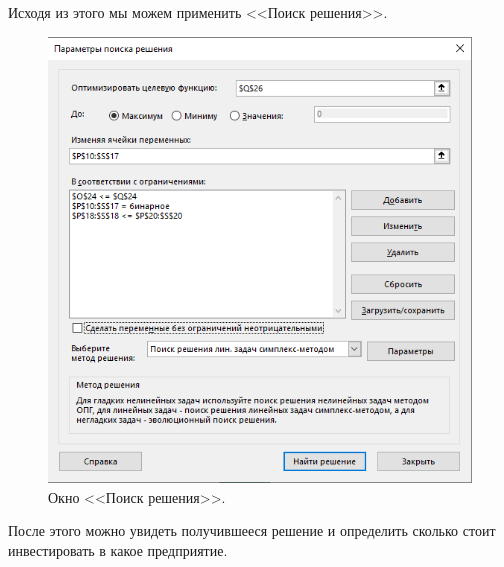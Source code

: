 Исходя из этого мы можем применить <<Поиск решения>>.
\begin{figure}[h]
  \centering \includegraphics[scale=0.7]{content/images/impl_investing3.png}
  \caption{Окно <<Поиск решения>>.}
  \label{fig:impl_investing3}
\end{figure}

После этого можно увидеть получившееся решение и определить сколько стоит инвестировать в какое предприятие.
